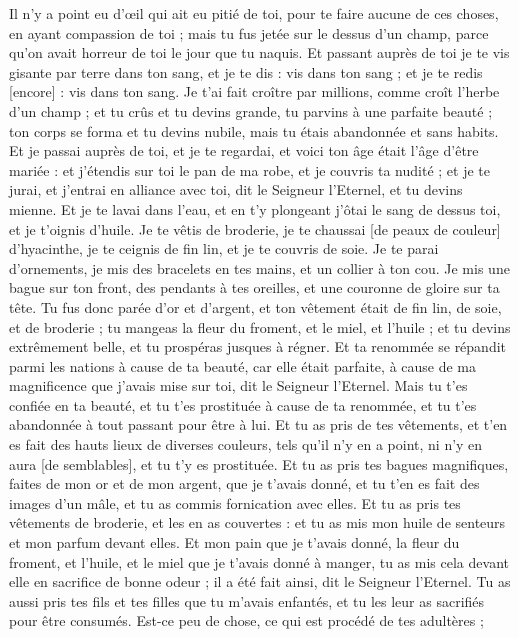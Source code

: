 \begin{multicols}{2}
Il n'y a point eu d'œil qui ait eu pitié de toi, pour te faire aucune de ces choses, en ayant compassion de toi ; mais tu fus jetée sur le dessus d'un champ, parce qu'on avait horreur de toi le jour que tu naquis.
Et passant auprès de toi je te vis gisante par terre dans ton sang, et je te dis : vis dans ton sang ; et je te redis [encore] : vis dans ton sang.
Je t'ai fait croître par millions, comme croît l'herbe d'un champ ; et tu crûs et tu devins grande, tu parvins à une parfaite beauté ; ton corps se forma et tu devins nubile, mais tu étais abandonnée et sans habits.
Et je passai auprès de toi, et je te regardai, et voici ton âge était l'âge d'être mariée : et j'étendis sur toi le pan de ma robe, et je couvris ta nudité ; et je te jurai, et j'entrai en alliance avec toi, dit le Seigneur l'Eternel, et tu devins mienne.
Et je te lavai dans l'eau, et en t'y plongeant j'ôtai le sang de dessus toi, et je t'oignis d'huile.
Je te vêtis de broderie, je te chaussai [de peaux de couleur] d'hyacinthe, je te ceignis de fin lin, et je te couvris de soie.
Je te parai d'ornements, je mis des bracelets en tes mains, et un collier à ton cou.
Je mis une bague sur ton front, des pendants à tes oreilles, et une couronne de gloire sur ta tête.
Tu fus donc parée d'or et d'argent, et ton vêtement était de fin lin, de soie, et de broderie ; tu mangeas la fleur du froment, et le miel, et l'huile ; et tu devins extrêmement belle, et tu prospéras jusques à régner.
Et ta renommée se répandit parmi les nations à cause de ta beauté, car elle était parfaite, à cause de ma magnificence que j'avais mise sur toi, dit le Seigneur l'Eternel.
Mais tu t'es confiée en ta beauté, et tu t'es prostituée à cause de ta renommée, et tu t'es abandonnée à tout passant pour être à lui.
Et tu as pris de tes vêtements, et t'en es fait des hauts lieux de diverses couleurs, tels qu'il n'y en a point, ni n'y en aura [de semblables], et tu t'y es prostituée.
Et tu as pris tes bagues magnifiques, faites de mon or et de mon argent, que je t'avais donné, et tu t'en es fait des images d'un mâle, et tu as commis fornication avec elles.
Et tu as pris tes vêtements de broderie, et les en as couvertes : et tu as mis mon huile de senteurs et mon parfum devant elles.
Et mon pain que je t'avais donné, la fleur du froment, et l'huile, et le miel que je t'avais donné à manger, tu as mis cela devant elle en sacrifice de bonne odeur ; il a été fait ainsi, dit le Seigneur l'Eternel.
Tu as aussi pris tes fils et tes filles que tu m'avais enfantés, et tu les leur as sacrifiés pour être consumés. Est-ce peu de chose, ce qui est procédé de tes adultères ;

\end{multicols}
